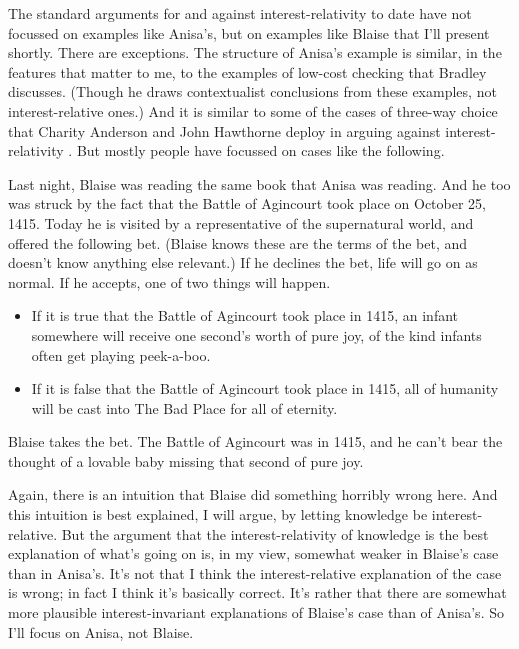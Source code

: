 \documentclass[11pt,]{book}
\providecommand{\tightlist}{%
  \setlength{\itemsep}{0pt}\setlength{\parskip}{0pt}}
\begin{document}
The standard arguments for and against interest-relativity to date have not focussed on examples like Anisa's, but on examples like Blaise that I'll present shortly. There are exceptions. The structure of Anisa's example is similar, in the features that matter to me, to the examples of low-cost checking that Bradley \citet{ArmourGarb2011} discusses. (Though he draws contextualist conclusions from these examples, not interest-relative ones.) And it is similar to some of the cases of three-way choice that Charity Anderson and John Hawthorne deploy in arguing against interest-relativity \citetext{\citeyear{AndersonHawthorne2019a}; \citeyear{AndersonHawthorne2019b}}. But mostly people have focussed on cases like the following.

Last night, Blaise was reading the same book that Anisa was reading. And he too was struck by the fact that the Battle of Agincourt took place on October 25, 1415. Today he is visited by a representative of the supernatural world, and offered the following bet. (Blaise knows these are the terms of the bet, and doesn't know anything else relevant.) If he declines the bet, life will go on as normal. If he accepts, one of two things will happen.

\begin{itemize}
\tightlist
\item
  If it is true that the Battle of Agincourt took place in 1415, an infant somewhere will receive one second's worth of pure joy, of the kind infants often get playing peek-a-boo.
\item
  If it is false that the Battle of Agincourt took place in 1415, all of humanity will be cast into The Bad Place for all of eternity.
\end{itemize}

Blaise takes the bet. The Battle of Agincourt was in 1415, and he can't bear the thought of a lovable baby missing that second of pure joy.

Again, there is an intuition that Blaise did something horribly wrong here. And this intuition is best explained, I will argue, by letting knowledge be interest-relative. But the argument that the interest-relativity of knowledge is the best explanation of what's going on is, in my view, somewhat weaker in Blaise's case than in Anisa's. It's not that I think the interest-relative explanation of the case is wrong; in fact I think it's basically correct. It's rather that there are somewhat more plausible interest-invariant explanations of Blaise's case than of Anisa's. So I'll focus on Anisa, not Blaise.
\end{document}
